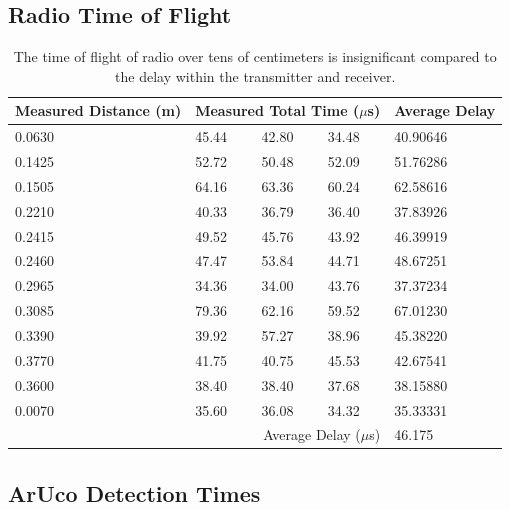 \documentclass{article}
\begin{document}
  \subsection{Radio Time of Flight}\label{appendix:rf-rx-tx}

    \begin{table}[H]
      \begin{tabular}{|l|l|l|l|l|}
        \hline
        Measured Distance (m) & \multicolumn{3}{|l|}{Measured Total Time ($\mu$s)} & Average Delay \\
        \hline
        0.0630 & 45.44 & 42.80 & 34.48 & 40.90646 \\
        0.1425 & 52.72 & 50.48 & 52.09 & 51.76286 \\
        0.1505 & 64.16 & 63.36 & 60.24 & 62.58616 \\
        0.2210 & 40.33 & 36.79 & 36.40 & 37.83926 \\
        0.2415 & 49.52 & 45.76 & 43.92 & 46.39919 \\
        0.2460 & 47.47 & 53.84 & 44.71 & 48.67251 \\
        0.2965 & 34.36 & 34.00 & 43.76 & 37.37234 \\
        0.3085 & 79.36 & 62.16 & 59.52 & 67.01230 \\
        0.3390 & 39.92 & 57.27 & 38.96 & 45.38220 \\
        0.3770 & 41.75 & 40.75 & 45.53 & 42.67541 \\
        0.3600 & 38.40 & 38.40 & 37.68 & 38.15880 \\
        0.0070 & 35.60 & 36.08 & 34.32 & 35.33331 \\
        \hline
        \multicolumn{4}{|r|}{Average Delay ($\mu$s)} & 46.175 \\
        \hline
      \end{tabular}
      \caption{The time of flight of radio over tens of centimeters is insignificant compared to the delay within the transmitter and receiver.}
      \label{table:rf-rx-tx}
    \end{table}

  \subsection{ArUco Detection Times}\label{appendix:tag_detection}
\end{document}
